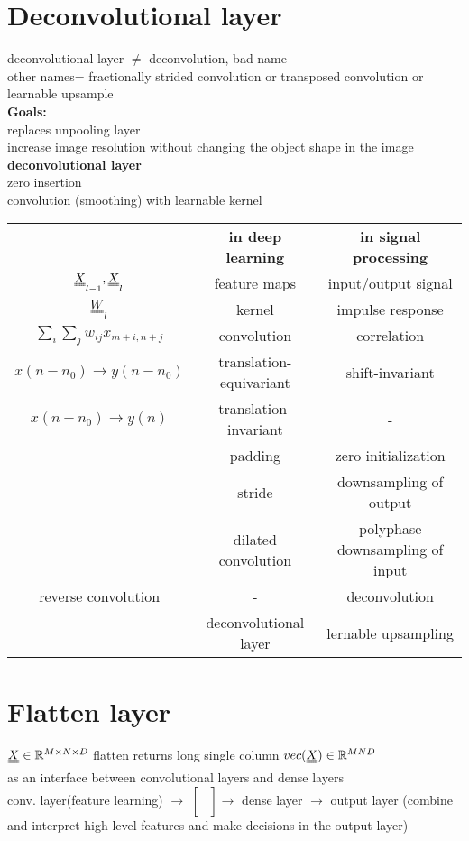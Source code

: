 \section{Deconvolutional layer}
deconvolutional layer  $  \neq $ deconvolution, bad name \\
other names= fractionally strided convolution or transposed convolution or learnable upsample\\
\textbf{Goals:}\\
\textbullet replaces unpooling layer \\
\textbullet increase image resolution without changing the object shape in the image \\
\textbf{deconvolutional layer}\\
\textbullet zero insertion \\
\textbullet convolution (smoothing) with learnable kernel\\
\begin{tabular}{ccc}
	&\textbf{ in deep learning} & \textbf{in signal processing}\\
$ \X_{l-1} , \X_l  $ & feature maps & input/output signal\\
$  \W_l  $ & kernel & impulse response \\
 $ \sum_{i} \sum_j w _{ij} x_{m+i, n+j}   $ & convolution & correlation \\
 $  x(n-n_0 ) \rightarrow y (n-n_0) $ & translation-equivariant & shift-invariant \\
 $  x(n-n_0 ) \rightarrow y(n) $ & translation-invariant & - \\
 & padding & zero initialization \\
  & stride & downsampling of output \\
  & dilated convolution & polyphase downsampling of input \\
  reverse convolution & - & deconvolution \\
   & deconvolutional layer & lernable upsampling
\end{tabular}
\section{Flatten layer}
$ \X \in \R^{M \times N \times D}  $ flatten returns long single column $ vec(\X) \in \R^{MND} $\\
as an interface between convolutional layers and dense layers \\
conv. layer(feature learning) $ \rightarrow $ $\left[ \begin{matrix}
\\
\\
\\
\\
\end{matrix} \right] \rightarrow$  dense layer $ \rightarrow $ output layer (combine and interpret high-level features and make decisions in the output layer)
